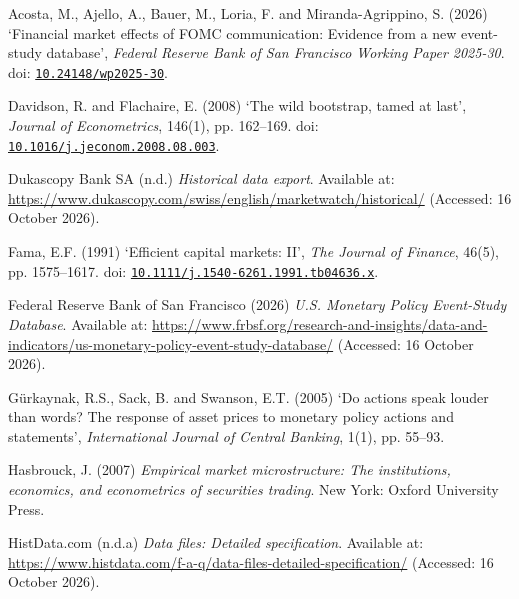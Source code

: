{\fontsize{10.3}{13}\selectfont\setlength{\parskip}{4pt}
\noindent\hangindent=16pt\hypertarget{ref:acosta2026}{}Acosta, M., Ajello, A., Bauer, M., Loria, F. and Miranda-Agrippino, S. (2026) ‘Financial market effects of FOMC communication: Evidence from a new event-study database’, \textit{Federal Reserve Bank of San Francisco Working Paper 2025-30}. doi: \href{https://doi.org/10.24148/wp2025-30}{\nolinkurl{10.24148/wp2025-30}}.\par
\noindent\hangindent=16pt\hypertarget{ref:davidson2008}{}Davidson, R. and Flachaire, E. (2008) ‘The wild bootstrap, tamed at last’, \textit{Journal of Econometrics}, 146(1), pp. 162–169. doi: \href{https://doi.org/10.1016/j.jeconom.2008.08.003}{\nolinkurl{10.1016/j.jeconom.2008.08.003}}.\par
\noindent\hangindent=16pt\hypertarget{ref:dukascopy}{}Dukascopy Bank SA (n.d.) \textit{Historical data export}. Available at: \url{https://www.dukascopy.com/swiss/english/marketwatch/historical/} (Accessed: 16 October 2026).\par
\noindent\hangindent=16pt\hypertarget{ref:fama1991}{}Fama, E.F. (1991) ‘Efficient capital markets: II’, \textit{The Journal of Finance}, 46(5), pp. 1575–1617. doi: \href{https://doi.org/10.1111/j.1540-6261.1991.tb04636.x}{\nolinkurl{10.1111/j.1540-6261.1991.tb04636.x}}.\par
\noindent\hangindent=16pt\hypertarget{ref:usmpd}{}Federal Reserve Bank of San Francisco (2026) \textit{U.S. Monetary Policy Event-Study Database}. Available at: \url{https://www.frbsf.org/research-and-insights/data-and-indicators/us-monetary-policy-event-study-database/} (Accessed: 16 October 2026).\par
\noindent\hangindent=16pt\hypertarget{ref:gurkaynak2005}{}Gürkaynak, R.S., Sack, B. and Swanson, E.T. (2005) ‘Do actions speak louder than words? The response of asset prices to monetary policy actions and statements’, \textit{International Journal of Central Banking}, 1(1), pp. 55–93.\par
\noindent\hangindent=16pt\hypertarget{ref:hasbrouck2007}{}Hasbrouck, J. (2007) \textit{Empirical market microstructure: The institutions, economics, and econometrics of securities trading}. New York: Oxford University Press.\par
\noindent\hangindent=16pt\hypertarget{ref:histdata-a}{}HistData.com (n.d.a) \textit{Data files: Detailed specification}. Available at: \url{https://www.histdata.com/f-a-q/data-files-detailed-specification/} (Accessed: 16 October 2026).\par
}
